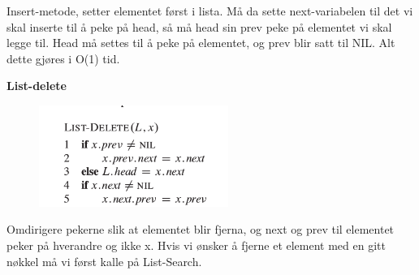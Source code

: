 \documentclass[12pt]{report}
\begin{document}
\begin{multicols}{2}

\par

 \par

Insert-metode, setter elementet først i lista. Må da sette next-variabelen til det vi skal inserte til å peke på head, så må head sin prev peke på elementet vi skal legge til. Head må settes til å peke på elementet, og prev blir satt til NIL. Alt dette gjøres i O(1) tid. \par


\vspace{\baselineskip}
\textbf{List-delete}\par




\begin{figure}[H]
	\begin{Center}
		\includegraphics[width=2.43in,height=1.3in]{./media/image17.png}
	\end{Center}
\end{figure}



\par

 \par

Omdirigere pekerne slik at elementet blir fjerna, og next og prev til elementet peker på hverandre og ikke x. Hvis vi ønsker å fjerne et element med en gitt nøkkel må vi først kalle på List-Search. \par


\vspace{\baselineskip}

\vspace{\baselineskip}

\vspace{\baselineskip}

\vspace{\baselineskip}


\end{multicols}
\end{document}
